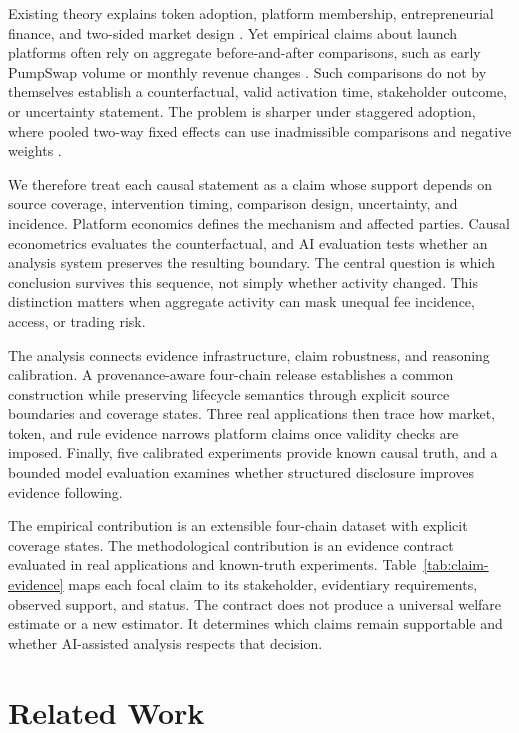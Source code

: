 \documentclass{article}
\begin{document}
Existing theory explains token adoption, platform membership, entrepreneurial finance, and two-sided market design \citep{cong2021tokenomics,sockinxiong2023,gryglewicz2021,malinovapark2023,rochettirole2003}. Yet empirical claims about launch platforms often rely on aggregate before-and-after comparisons, such as early PumpSwap volume or monthly revenue changes \citep{theblock2025pumpswap,cointelegraph2025pumpswap,cryptoslate2025pumpfun}. Such comparisons do not by themselves establish a counterfactual, valid activation time, stakeholder outcome, or uncertainty statement. The problem is sharper under staggered adoption, where pooled two-way fixed effects can use inadmissible comparisons and negative weights \citep{goodmanbacon2021,dechaisemartin2020,roth2023trending}.

We therefore treat each causal statement as a claim whose support depends on source coverage, intervention timing, comparison design, uncertainty, and incidence. Platform economics defines the mechanism and affected parties. Causal econometrics evaluates the counterfactual, and AI evaluation tests whether an analysis system preserves the resulting boundary. The central question is which conclusion survives this sequence, not simply whether activity changed. This distinction matters when aggregate activity can mask unequal fee incidence, access, or trading risk.

The analysis connects evidence infrastructure, claim robustness, and reasoning calibration. A provenance-aware four-chain release establishes a common construction while preserving lifecycle semantics through explicit source boundaries and coverage states. Three real applications then trace how market, token, and rule evidence narrows platform claims once validity checks are imposed. Finally, five calibrated experiments provide known causal truth, and a bounded model evaluation examines whether structured disclosure improves evidence following.

The empirical contribution is an extensible four-chain dataset with explicit coverage states. The methodological contribution is an evidence contract evaluated in real applications and known-truth experiments. Table~\ref{tab:claim-evidence} maps each focal claim to its stakeholder, evidentiary requirements, observed support, and status. The contract does not produce a universal welfare estimate or a new estimator. It determines which claims remain supportable and whether AI-assisted analysis respects that decision.

\section{Related Work}
\label{sec:related}
\end{document}
